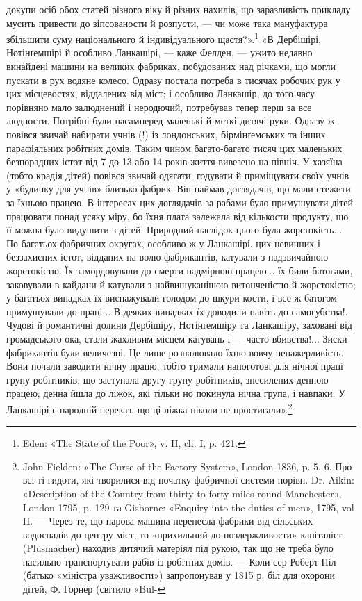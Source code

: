 \parcont{}  %
докупи осіб обох статей різного віку й різних нахилів, що заразливість прикладу мусить привести до
зіпсованости й розпусти, — чи може така мануфактура збільшити суму національного й індивідуального
щастя?».\footnote{
Eden: «The State of the Poor», v. II, ch. I, p. 421.
} «В Дербішірі, Нотінґемшірі й особливо
Ланкашірі, — каже Фелден, — ужито недавно винайдені машини на великих фабриках, побудованих над
річками, що могли пускати в рух водяне колесо. Одразу постала потреба в тисячах робочих рук у цих
місцевостях, віддалених від міст; і особливо
Ланкашір, до того часу порівняно мало залюднений і неродючий, потребував тепер перш за все людности.
Потрібні були насамперед маленькі й меткі дитячі руки. Одразу ж повівся звичай набирати учнів (!) із
лондонських, бірмінґемських та інших парафіяльних робітних домів. Таким чином багато-багато тисяч
цих маленьких безпорадних істот від 7 до 13 або 14 років життя вивезено на північ. У хазяїна (тобто
крадія дітей) повівся звичай одягати, годувати й приміщувати своїх учнів у «будинку для учнів»
близько фабрик. Він наймав доглядачів, що мали стежити за їхньою працею. В інтересах цих доглядачів
за рабами було примушувати дітей працювати понад усяку міру, бо їхня плата залежала від кількости
продукту, що її можна було видушити
з дітей. Природний наслідок цього була жорстокість... По багатьох фабричних округах, особливо ж у
Ланкашірі, цих невинних і беззахисних істот, відданих на волю фабрикантів, катували з надзвичайною
жорстокістю. Їх замордовували до смерти надмірною працею... їх били батогами, заковували в кайдани й
катували з найвишуканішою витонченістю й жорстокістю; у багатьох випадках їх виснажували голодом до
шкури-кости, і все ж батогом примушували до праці... В деяких випадках їх доводили навіть до
самогубства!.. Чудові й романтичні долини Дербішіру, Нотінґемшіру та Ланкашіру, заховані від
громадського ока, стали жахливим місцем катувань і — часто вбивства!... Зиски фабрикантів були
величезні. Це лише розпалювало їхню вовчу ненажерливість. Вони почали заводити нічну працю, тобто
тримали напоготові для нічної праці групу робітників, що заступала другу групу робітників,
знесилених денною працею; денна йшла до ліжок, які тільки но покинула нічна група, і навпаки. У
Ланкашірі є народній переказ, що ці ліжка ніколи не простигали».\footnote{
John Fielden: «The Curse of the Factory System», London 1836, p. 5, 6. Про всі ті гидоти, які
творилися від початку фабричної системи порівн. Dr. Aikin: «Description of the Country from thirty
to forty miles round Manchester», London 1795, p. 129 та Gisborne: «Enquiry into the duties of men»,
1795, vol II. — Через те, що парова машина перенесла
фабрики від сільських водоспадів до центру міст, то «прихильний до поздержливости» капіталіст
(Plusmacher) находив дитячий матеріял під рукою, так що не треба було насильно транспортувати рабів
із робітних домів. — Коли сер Роберт Піл (батько «міністра уважливости») запропонував у 1815 р. біл
для охорони дітей, Ф. Горнер (світило «Bul-
}

